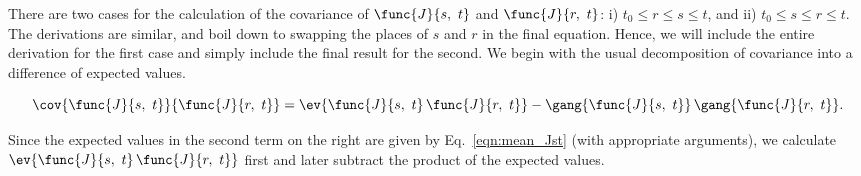 There are two cases for the calculation of the covariance of $\func{J}{s,\ t}$ and $\func{J}{r,\ t}$: i) $t_0 \leq r \leq s \leq t$, and ii) $t_0 \leq s \leq r \leq t$. The derivations are similar, and boil down to swapping the places of $s$ and $r$ in the final equation. Hence, we will include the entire derivation for the first case and simply include the final result for the second. We begin with the usual decomposition of covariance into a difference of expected values.

\begin{equation}
    \cov{\func{J}{s,\ t}}{\func{J}{r,\ t}} = \ev{\func{J}{s,\ t}\,\func{J}{r,\ t}} - \gang{\func{J}{s,\ t}}\,\gang{\func{J}{r,\ t}}.
\end{equation}

Since the expected values in the second term on the right are given by Eq.~\ref{eqn:mean_Jst} (with appropriate arguments), we calculate $\ev{\func{J}{s,\ t}\,\func{J}{r,\ t}}$ first and later subtract the product of the expected values.

